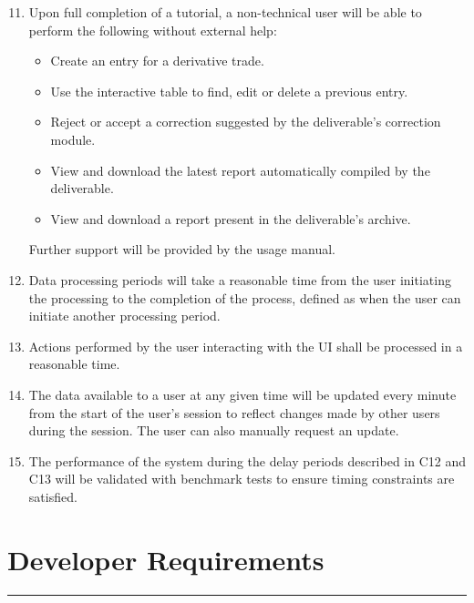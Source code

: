 \documentclass[8pt]{extarticle}
\begin{document}
\begin{enumerate}[label=C\arabic*]
\setcounter{enumi}{10}
\item Upon full completion of a tutorial, a non-technical user will be able to perform the following without external help: 

\begin{itemize}
\item Create an entry for a derivative trade. 

\item Use the interactive table to find, edit or delete a previous entry. 

\item Reject or accept a correction suggested by the deliverable’s correction module. 

\item View and download the latest report automatically compiled by the deliverable. 

\item View and download a report present in the deliverable’s archive. 
\end{itemize}

Further support will be provided by the usage manual. 

\item Data processing periods will take a reasonable time from the user initiating the processing to the completion of the process, defined as when the user can initiate another processing period. 

\item Actions performed by the user interacting with the UI shall be processed in a reasonable time. 

\item The data available to a user at any given time will be updated every minute from the start of the user's session to reflect changes made by other users during the session. The user can also manually request an update. 

\item The performance of the system during the delay periods described in C12 and C13 will be validated with benchmark tests to ensure timing constraints are satisfied.

\end{enumerate}

\newpage
\section*{Developer Requirements}
\hrule
\vspace{9pt}
\end{document}
